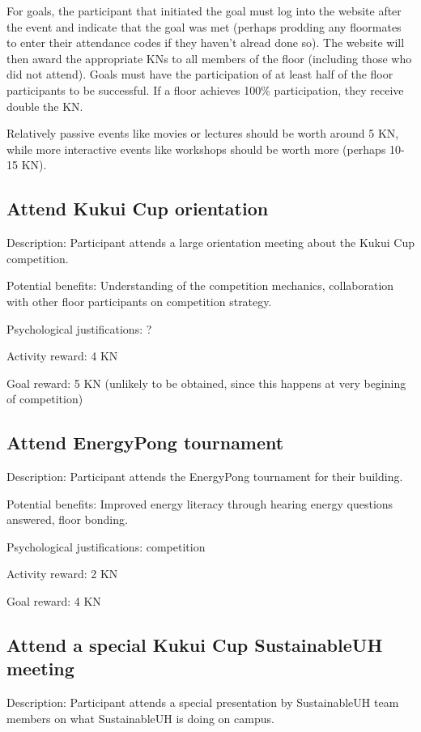 For goals, the participant that initiated the goal must log into the website after the event and indicate that the goal was met (perhaps prodding any floormates to enter their attendance codes if they haven't alread done so). The website will then award the appropriate KNs to all members of the floor (including those who did not attend). Goals must have the participation of at least half of the floor participants to be successful. If a floor achieves 100\% participation, they receive double the KN.

Relatively passive events like movies or lectures should be worth around 5 KN, while more interactive events like workshops should be worth more (perhaps 10-15 KN).

\subsection{Attend Kukui Cup orientation}

Description: Participant attends a large orientation meeting about the Kukui Cup competition.

Potential benefits: Understanding of the competition mechanics, collaboration with other floor participants on competition strategy.

Psychological justifications: ?

Activity reward: 4 KN

Goal reward: 5 KN (unlikely to be obtained, since this happens at very begining of competition)

\subsection{Attend EnergyPong tournament}

Description: Participant attends the EnergyPong tournament for their building.

Potential benefits: Improved energy literacy through hearing energy questions answered, floor bonding.

Psychological justifications: competition

Activity reward: 2 KN

Goal reward: 4 KN

\subsection{Attend a special Kukui Cup SustainableUH meeting}

Description: Participant attends a special presentation by SustainableUH team members on what SustainableUH is doing on campus.


